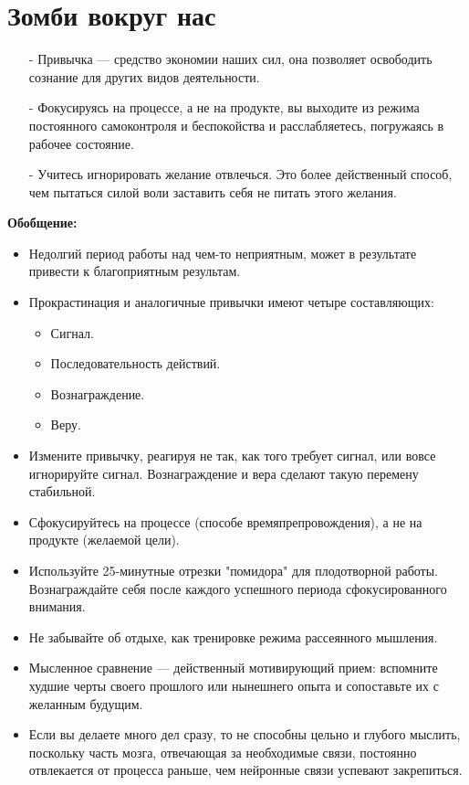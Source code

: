 \documentclass{article}
\begin{document}
\section{Зомби вокруг нас}
\begin{itemize}
\item[-] Привычка --- средство экономии наших сил, она позволяет освободить сознание для других видов деятельности.
\item[-] Фокусируясь на процессе, а не на продукте, вы выходите из режима постоянного самоконтроля и беспокойства и расслабляетесь, погружаясь в рабочее состояние.
\item[-] Учитесь игнорировать желание отвлечься. Это более действенный способ, чем пытаться силой воли заставить себя не питать этого желания.
\end{itemize}
\textbf{Обобщение:}
\begin{itemize}
\item Недолгий период работы над чем-то неприятным, может в результате привести к благоприятным результам.
\item Прокрастинация и аналогичные привычки имеют четыре составляющих:
\begin{itemize}
\item Сигнал.
\item Последовательность действий.
\item Вознаграждение.
\item Веру.
\end{itemize}
\item Измените привычку, реагируя не так, как того требует сигнал, или вовсе игнорируйте сигнал. Вознаграждение и вера сделают такую перемену стабильной.
\item Сфокусируйтесь на процессе (способе времяпрепровождения), а не на продукте (желаемой цели).
\item Используйте 25-минутные отрезки "помидора" для плодотворной работы. Вознаграждайте себя после каждого успешного периода сфокусированного внимания.
\item Не забывайте об отдыхе, как тренировке режима рассеянного мышления.
\item Мысленное сравнение --- действенный мотивирующий прием: вспомните худшие черты своего прошлого или нынешнего опыта и сопоставьте их с желанным будущим.
\item Если вы делаете много дел сразу, то не способны цельно и глубого мыслить, поскольку часть мозга, отвечающая за необходимые связи, постоянно отвлекается от процесса раньше, чем нейронные связи успевают закрепиться.
\end{itemize}
\end{document}

